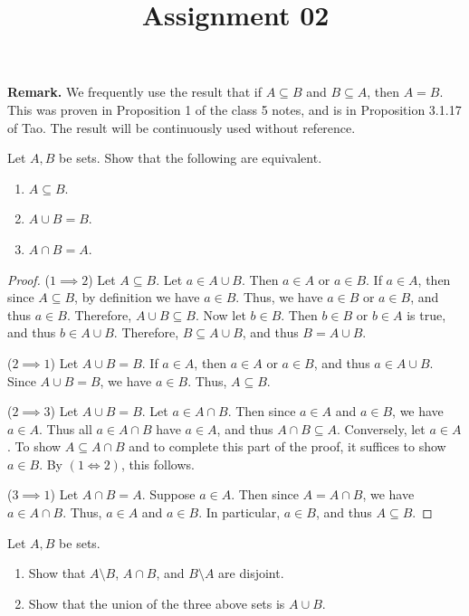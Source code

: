 \documentclass[11pt, letterpaper]{article}
\title{Assignment 02}
\begin{document}
\makeproblem

\noindent\textbf{Remark.} We frequently use the result that if $A\subseteq B$ and $B\subseteq A$, then $A=B$. This was proven in Proposition 1 of the class 5 notes, and is in Proposition 3.1.17 of Tao. The result will be continuously used without reference.

\begin{problem}[Exercise 3.1.5]\label{prob:1}
	Let $A,B$ be sets. Show that the following are equivalent.
	\begin{enumerate}[label=(\arabic*)]
		\item $A\subseteq B$.
		\item $A\cup B=B$.
		\item $A \cap B=A$.
	\end{enumerate}
\end{problem}
\begin{proof}
	($1\implies 2$) Let $A\subseteq B$. Let $a\in A \cup B$. Then $a\in A$ or $a\in B$. If $a\in A$, then since $A\subseteq B$, by definition we have $a\in B$. Thus, we have $a\in B$ or $a\in B$, and thus $a\in B$. Therefore, $A \cup B \subseteq B$. Now let $b\in B$. Then $b\in B$ or $b\in A$ is true, and thus $b\in A \cup B$. Therefore, $B\subseteq A \cup B$, and thus $B = A \cup B$.

	($2\implies 1$) Let $A \cup B = B$. If $a\in A$, then $a\in A$ or $a\in B$, and thus $a\in A \cup B$. Since $A \cup B=B$, we have $a\in B$. Thus, $A\subseteq B$.

	($2\implies 3$) Let $A \cup B = B$. Let $a\in A \cap B$. Then since $a\in A$ and $a\in B$, we have $a\in A$. Thus all $a\in A \cap B$ have $a\in A$, and thus $A \cap B \subseteq A$. Conversely, let $a\in A$. To show $A \subseteq A \cap B$ and to complete this part of the proof, it suffices to show $a\in B$. By $(1 \iff 2)$, this follows.

	($3\implies 1$) Let $A \cap B=A$. Suppose $a\in A$. Then since $A = A \cap B$, we have $a\in A \cap B$. Thus, $a\in A$ and $a\in B$. In particular, $a\in B$, and thus $A\subseteq B$.
\end{proof}


\begin{problem}[Exercise 3.1.10]\label{prob:2}
	Let $A,B$ be sets.
	\begin{enumerate}[label=(\arabic*)]
		\item Show that $A\setminus B$, $A \cap B$, and $B\setminus A$ are disjoint.
		\item Show that the union of the three above sets is $A \cup B$.
	\end{enumerate}
\end{problem}
\end{document}
